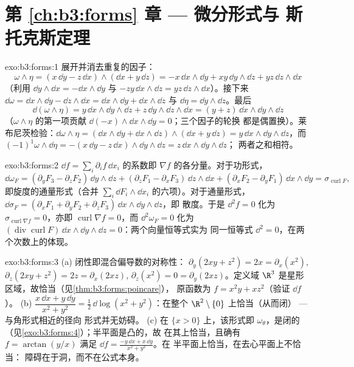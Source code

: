 \section*{第 \ref{ch:b3:forms} 章 --- 微分形式与
斯托克斯定理}

\begin{solution}{exo:b3:forms:1}
展开并消去重复的因子：
\[
\omega\wedge\eta = (x\,\dd y - z\,\dd x)\wedge(\dd x +
y\,\dd z)
= -x\,\dd x\wedge\dd y + xy\,\dd y\wedge\dd z +
yz\,\dd z\wedge\dd x
\]
（利用 $\dd y\wedge\dd x = -\dd x\wedge\dd y$ 与 $-zy\,\dd
x\wedge\dd z = yz\,\dd z\wedge\dd x$）。接下来 $\dd\omega =
\dd x\wedge\dd y - \dd z\wedge\dd x = \dd x\wedge\dd y +
\dd x\wedge\dd z$ 与 $\dd\eta = \dd y\wedge\dd z$。最后
\[
\dd(\omega\wedge\eta) = y\,\dd x\wedge\dd y\wedge\dd z +
z\,\dd y\wedge\dd z\wedge\dd x = (y + z)\,\dd x\wedge\dd
y\wedge\dd z
\]
（$\omega\wedge\eta$ 的第一项贡献 $\dd(-x)
\wedge\dd x\wedge\dd y = 0$；三个因子的轮换
都是偶置换）。莱布尼茨检验：$\dd\omega\wedge\eta =
(\dd x\wedge\dd y + \dd x\wedge\dd z)\wedge(\dd x + y\,\dd
z) = y\,\dd x\wedge\dd y\wedge\dd z$，而
$(-1)^1\omega\wedge\dd\eta = -(x\,\dd y - z\,\dd
x)\wedge\dd y\wedge\dd z = z\,\dd x\wedge\dd y\wedge\dd z$；
两者之和相符。
\end{solution}

\begin{solution}{exo:b3:forms:2}
$\dd f = \sum_i\partial_if\,\dd x_i$ 的系数即
$\nabla f$ 的各分量。对于功形式，
\[
\dd\omega_F = (\partial_yF_3 - \partial_zF_2)\,\dd y\wedge\dd
z + (\partial_zF_1 - \partial_xF_3)\,\dd z\wedge\dd x +
(\partial_xF_2 - \partial_yF_1)\,\dd x\wedge\dd y =
\sigma_{\operatorname{curl}F},
\]
即旋度的通量形式（合并
$\sum_i\dd F_i\wedge\dd x_i$ 的六项）。对于通量形式，
$\dd\sigma_F = (\partial_xF_1 + \partial_yF_2 +
\partial_zF_3)\,\dd x\wedge\dd y\wedge\dd z$，即
散度。于是 $\dd^2f = 0$ 化为
$\sigma_{\operatorname{curl}\nabla f} = 0$，亦即
$\operatorname{curl}\nabla f = 0$，而 $\dd^2\omega_F = 0$
化为 $(\operatorname{div}\operatorname{curl}F)\,\dd
x\wedge\dd y\wedge\dd z = 0$：两个向量恒等式实为
同一恒等式 $\dd^2 = 0$，在两个次数上的体现。
\end{solution}

\begin{solution}{exo:b3:forms:3}
(a) 闭性即混合偏导数的对称性：
$\partial_y(2xy + z^2) = 2x = \partial_x(x^2)$,
$\partial_z(2xy + z^2) = 2z = \partial_x(2xz)$,
$\partial_z(x^2) = 0 = \partial_y(2xz)$。定义域 $\R^3$
是星形区域，故恰当（见\cref{thm:b3:forms:poincare}），
原函数为 $f = x^2y + xz^2$（验证 $\dd f$）。
(b) $\dfrac{x\,\dd x + y\,\dd y}{x^2 + y^2} =
\tfrac12\,\dd\log(x^2 + y^2)$：在整个
$\R^2\setminus\{0\}$ 上恰当（从而闭） --- 与角形式相近的径向
形式并无妨碍。
(c) 在 $\{x > 0\}$ 上，该形式即 $\omega_\theta$，是闭的
（见\cref{exo:b3:forms:4}）；半平面是凸的，故
在其上恰当，且确有 $f = \arctan(y/x)$ 满足 $\dd f
= \frac{-y\,\dd x + x\,\dd y}{x^2 + y^2}$。在
半平面上恰当，在去心平面上不恰当：
障碍在于洞，而不在公式本身。
\end{solution}

